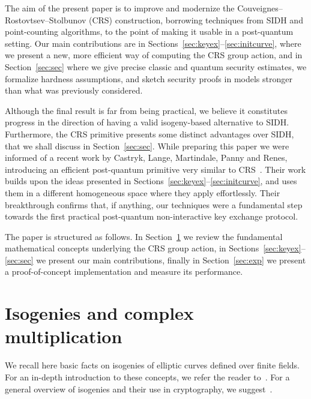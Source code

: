 \documentclass{article}
\theoremstyle{definition}
\begin{document}
The aim of the present paper is to improve and modernize the
Couveignes--Rostovtsev--Stolbunov (CRS) construction, borrowing
techniques from SIDH and point-counting algorithms, to the point of
making it usable in a post-quantum setting.  Our main contributions
are in Sections~\ref{sec:keyex}--\ref{sec:initcurve}, where we present
a new, more efficient way of computing the CRS group action, and in
Section~\ref{sec:sec} where we give precise classic and quantum
security estimates, we formalize hardness assumptions, and sketch
security proofs in models stronger than what was previously
considered.

Although the final result is far from being practical, we believe it
constitutes progress in the direction of having a valid isogeny-based
alternative to SIDH.  Furthermore, the CRS primitive presents some
distinct advantages over SIDH, that we shall discuss in
Section~\ref{sec:sec}. While preparing this paper we were informed of
a recent work by Castryk, Lange, Martindale, Panny and Renes,
introducing an efficient post-quantum primitive very similar to
CRS~\cite{csidh}.  Their work builds upon the ideas presented in
Sections~\ref{sec:keyex}--\ref{sec:initcurve}, and uses them in a
different homogeneous space where they apply effortlessly.  Their
breakthrough confirms that, if anything, our techniques were a
fundamental step towards the first practical post-quantum
non-interactive key exchange protocol.

The paper is structured as follows. In Section~\ref{sec:math} we
review the fundamental mathematical concepts underlying the CRS group
action, in Sections~\ref{sec:keyex}--\ref{sec:sec} we present our main
contributions, finally in Section~\ref{sec:exp} we present a
proof-of-concept implementation and measure its performance.

\section{Isogenies and complex multiplication}
\label{sec:math}

We recall here basic facts on isogenies of elliptic curves defined
over finite fields. For an in-depth introduction to these concepts, we
refer the reader to~\cite{silverman:elliptic}. For a general
overview of isogenies and their use in cryptography, we
suggest~\cite{defeo2017isogenybased}.
\end{document}
